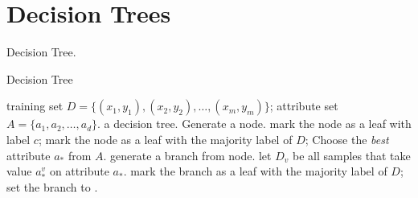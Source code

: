 \section{Decision Trees}
Decision Tree.

\begin{algorithm}
    \caption{Decision Tree}\label{decision_tree}
    \begin{algorithmic}[1]
        \Require training set $D = \{(x_1, y_1), (x_2, y_2), \ldots, (x_m, y_m)
        \}$; attribute set $A = \{a_1, a_2, \ldots, a_d\}$.
        \Ensure a decision tree.
            \State Generate a node.
             
                \State mark the node as a leaf with label $c$; \Return
            \EndIf
                \State mark the node as a leaf with the majority label of $D$; 
                \Return
            \EndIf
            \State Choose the \textit{best} attribute $a_*$ from $A$.\label{measurement}
                \State generate a branch from node.
                \State let $D_v$ be all samples that take value $a_*^v$ on attribute
                $a_*$.
                 
                    \State mark the branch as a leaf with the majority label of 
                    $D$; \Return
                \Else
                    \State set the branch to .
                \EndIf
            \EndFor
        \EndProcedure
    \end{algorithmic}
\end{algorithm}